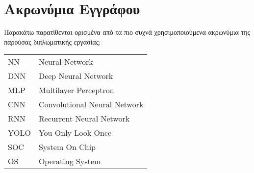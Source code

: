 \chapter*{Ακρωνύμια Εγγράφου}
\label{append:acronyms}
{}

Παρακάτω παρατίθενται ορισμένα από τα πιο συχνά χρησιμοποιούμενα ακρωνύμια της
παρούσας διπλωματικής εργασίας:

\begin{table}[htpb]
  \centering
  \begin{tabular}{l@{$\;\;\longrightarrow\;\;$}l}
    NN & Neural Network \\
    DNN & Deep Neural Network \\
    MLP & Multilayer Perceptron \\
    CNN & Convolutional Neural Network \\
    RNN & Recurrent Neural Network \\
    YOLO & You Only Look Once \\
    SOC & System On Chip \\
    OS & Operating System
  \end{tabular}
\end{table}
